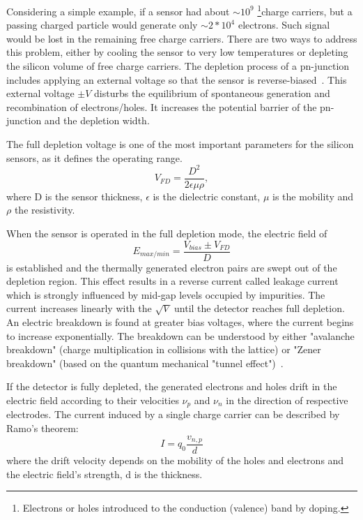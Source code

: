 Considering a simple example, if a sensor had about $\sim10^{9}$ \footnote{Electrons or holes introduced to the conduction (valence) band by doping.}{charge carriers}, but a passing charged particle would generate only $\sim2*10^{4}$ electrons. Such signal would be lost in the remaining free charge carriers. There are two ways to address this problem, either by cooling the sensor to very low temperatures or depleting the silicon volume of free charge carriers. The depletion process of a pn-junction includes applying an external voltage so that the sensor is reverse-biased~\cite{Spieler}. This external voltage $\pm V$ disturbs the equilibrium of spontaneous generation and recombination of electrons/holes. It increases the potential barrier of the pn-junction and the depletion width. 

The full depletion voltage is one of the most important parameters for the silicon sensors, as it defines the operating range. 
\begin{equation}
    V_{FD} = \frac{D^{2}}{2\epsilon \mu \rho},
\end{equation}
where D is the sensor thickness, $\epsilon$ is the dielectric constant, $\mu$ is the mobility and $\rho$ the resistivity.

When the sensor is operated in the full depletion mode, the electric field of 
\begin{equation}
    E_{max/min} = \frac{V_{bias}\pm V_{FD}}{D}
\end{equation}
is established and the thermally generated electron pairs are swept out of the depletion region. This effect results in a reverse current called leakage current which is strongly influenced by mid-gap levels occupied by impurities. The current increases linearly with the $\sqrt{V}$ until the detector reaches full depletion. An electric breakdown is found at greater bias voltages, where the current begins to increase exponentially. The breakdown can be understood by either "avalanche breakdown" (charge multiplication in collisions with the lattice) or "Zener breakdown" (based on the quantum mechanical "tunnel effect")~\cite{Hartmann:2017gzy}.

If the detector is fully depleted, the generated electrons and holes drift in the electric field according to their velocities $\nu_{p}$ and $\nu_{n}$ in the direction of respective electrodes. The current induced by a single charge carrier can be described by Ramo's theorem:
\begin{equation}
    I = q_{0}\frac{v_{n,p}}{d}
\end{equation}
where the drift velocity depends on the mobility of the holes and electrons and the electric field's strength, d is the thickness.

